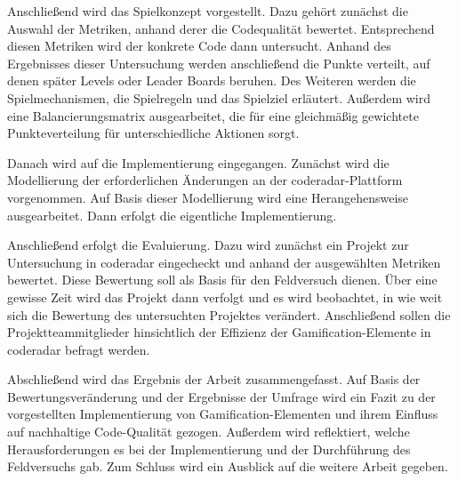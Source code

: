 \documentclass[fontsize=11pt, paper=a4, parskip=half]{scrartcl}
\begin{document}
Anschließend wird das Spielkonzept vorgestellt.
Dazu gehört zunächst die Auswahl der Metriken, anhand derer die Codequalität bewertet.
Entsprechend diesen Metriken wird der konkrete Code dann untersucht.
Anhand des Ergebnisses dieser Untersuchung werden anschließend die Punkte verteilt, auf denen später Levels oder Leader Boards beruhen.
Des Weiteren werden die Spielmechanismen, die Spielregeln und das Spielziel erläutert.
Außerdem wird eine Balancierungsmatrix ausgearbeitet, die für eine gleichmäßig gewichtete Punkteverteilung für unterschiedliche Aktionen sorgt.

Danach wird auf die Implementierung eingegangen.
Zunächst wird die Modellierung der erforderlichen Änderungen an der coderadar-Plattform vorgenommen.
Auf Basis dieser Modellierung wird eine Herangehensweise ausgearbeitet.
Dann erfolgt die eigentliche Implementierung.

Anschließend erfolgt die Evaluierung.
Dazu wird zunächst ein Projekt zur Untersuchung in coderadar eingecheckt und anhand der ausgewählten Metriken bewertet.
Diese Bewertung soll als Basis für den Feldversuch dienen.
Über eine gewisse Zeit wird das Projekt dann verfolgt und es wird beobachtet, in wie weit sich die Bewertung des untersuchten Projektes verändert.
Anschließend sollen die Projektteammitglieder hinsichtlich der Effizienz der Gamification-Elemente in coderadar befragt werden.

Abschließend wird das Ergebnis der Arbeit zusammengefasst.
Auf Basis der Bewertungsveränderung und der Ergebnisse der Umfrage wird ein Fazit zu der vorgestellten Implementierung von Gamification-Elementen und ihrem Einfluss auf nachhaltige Code-Qualität gezogen.
Außerdem wird reflektiert, welche Herausforderungen es bei der Implementierung und der Durchführung des Feldversuchs gab.
Zum Schluss wird ein Ausblick auf die weitere Arbeit gegeben.

\pagebreak



\end{document}
